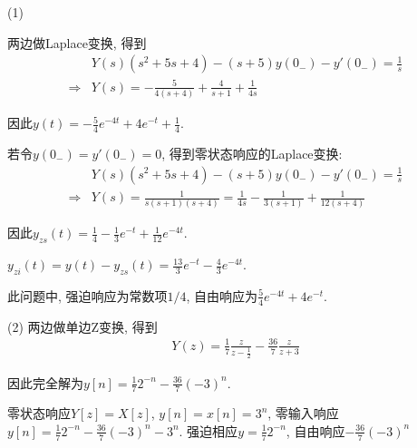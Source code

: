 (1) 

两边做Laplace变换, 得到\begin{align*}
    &Y(s)(s^2+5s+4)-(s+5)y(0_-)-y'(0_-)=\frac{1}{s} \\
    \Rightarrow& Y(s)=-\frac{5}{4(s+4)}+\frac{4}{s+1}+\frac{1}{4s}
\end{align*}

因此$y(t)=-\frac{5}{4}e^{-4t}+4e^{-t}+\frac{1}{4}$.

若令$y(0_-)=y'(0_-)=0$, 得到零状态响应的Laplace变换:\begin{align*}
    &Y(s)(s^2+5s+4)-(s+5)y(0_-)-y'(0_-)=\frac{1}{s} \\\Rightarrow& Y(s)=\frac{1}{s(s+1)(s+4)}=\frac{1}{4s}-\frac{1}{3(s+1)}+\frac{1}{12(s+4)}
\end{align*}

因此$y_{zs}(t)=\frac{1}{4}-\frac{1}{3}e^{-t}+\frac{1}{12}e^{-4t}$.

$y_{zi}(t)=y(t)-y_{zs}(t)=\frac{13}{3}e^{-t}-\frac{4}{3}e^{-4t}$.

此问题中, 强迫响应为常数项$1/4$, 自由响应为$\frac{5}{4}e^{-4t}+4e^{-t}$.

(2) 两边做单边Z变换, 得到
\begin{align*}
    Y(z)=\frac{1}{7}\frac{z}{z-\frac{1}{2}}-\frac{36}{7}\frac{z}{z+3}
\end{align*}

因此完全解为$y[n]=\frac{1}{7}2^{-n}-\frac{36}{7}(-3)^n$.

零状态响应$Y[z]=X[z]$, $y[n]=x[n]=3^n$, 零输入响应$y[n]=\frac{1}{7}2^{-n}-\frac{36}{7}(-3)^n-3^n$. 强迫相应$y=\frac{1}{7}2^{-n}$, 自由响应$-\frac{36}{7}(-3)^n$



